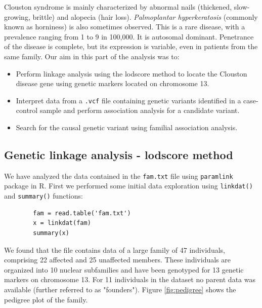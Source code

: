 \documentclass[a4paper,12pt]{article}
\begin{document}
Clouston syndrome is mainly characterized by abnormal nails (thickened, slow-growing, brittle) 
and alopecia (hair loss). \textit{Palmoplantar hyperkeratosis} (commonly known as horniness) is 
also sometimes observed. 
This is a rare disease, with a prevalence ranging from 1 to 9 in 100,000. It is autosomal dominant. 
Penetrance of the disease is complete, but its expression is variable, even in patients from the same family.
Our aim in this part of the analysis was to:

\begin{itemize}
    \item Perform linkage analysis using the lodscore method to locate the Clouston disease gene 
    using genetic markers located on chromosome 13.
    \item Interpret data from a \texttt{.vcf} file containing genetic variants identified in a 
    case-control sample and perform association analysis for a candidate variant.
    \item Search for the causal genetic variant using familial association analysis.
\end{itemize}

\subsection{Genetic linkage analysis - lodscore method}

We have analyzed the data contained in the \texttt{fam.txt} file using \texttt{paramlink} package in R. 
First we performed some initial data exploration using \texttt{linkdat()} and \texttt{summary()} functions:

    
    \begin{verbatim}
        fam = read.table('fam.txt')
        x = linkdat(fam)
        summary(x)
        \end{verbatim}


\newpage
We found that the file contains data of a large family of 47 individuals, comprising 22 affected and
 25 unaffected members. These individuals are organized into 10 nuclear subfamilies and 
have been genotyped for 13 genetic markers on chromosome 13. For 11 individuals in the dataset no 
parent data was available (further referred to as "founders"). Figure \ref{fig:pedigree} shows 
the pedigree plot of the family.
\end{document}

